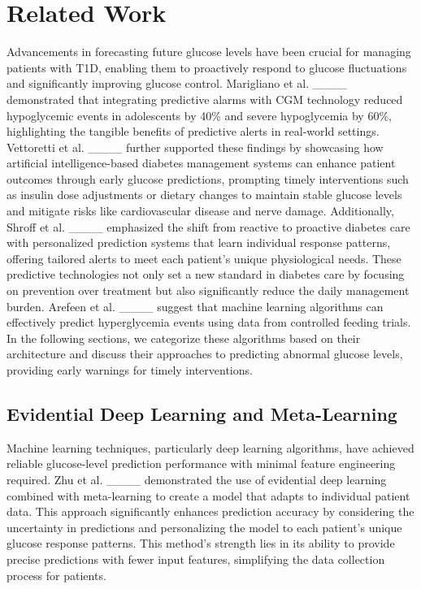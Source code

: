 \section{Related Work}
Advancements in forecasting future glucose levels have been crucial for managing patients with T1D, enabling them to proactively respond to glucose fluctuations and significantly improving glucose control. Marigliano et al. ____ demonstrated that integrating predictive alarms with CGM technology reduced hypoglycemic events in adolescents by 40\% and severe hypoglycemia by 60\%, highlighting the tangible benefits of predictive alerts in real-world settings. Vettoretti et al. ____ further supported these findings by showcasing how artificial intelligence-based diabetes management systems can enhance patient outcomes through early glucose predictions, prompting timely interventions such as insulin dose adjustments or dietary changes to maintain stable glucose levels and mitigate risks like cardiovascular disease and nerve damage. Additionally, Shroff et al. ____ emphasized the shift from reactive to proactive diabetes care with personalized prediction systems that learn individual response patterns, offering tailored alerts to meet each patient's unique physiological needs. These predictive technologies not only set a new standard in diabetes care by focusing on prevention over treatment but also significantly reduce the daily management burden. Arefeen et al. ____ suggest that machine learning algorithms can effectively predict hyperglycemia events using data from controlled feeding trials. In the following sections, we categorize these algorithms based on their architecture and discuss their approaches to predicting abnormal glucose levels, providing early warnings for timely interventions.

\subsection{Evidential Deep Learning and Meta-Learning}
Machine learning techniques, particularly deep learning algorithms, have achieved reliable glucose-level prediction performance with minimal feature engineering required. Zhu et al. ____ demonstrated the use of evidential deep learning combined with meta-learning to create a model that adapts to individual patient data. This approach significantly enhances prediction accuracy by considering the uncertainty in predictions and personalizing the model to each patient's unique glucose response patterns. This method's strength lies in its ability to provide precise predictions with fewer input features, simplifying the data collection process for patients.

